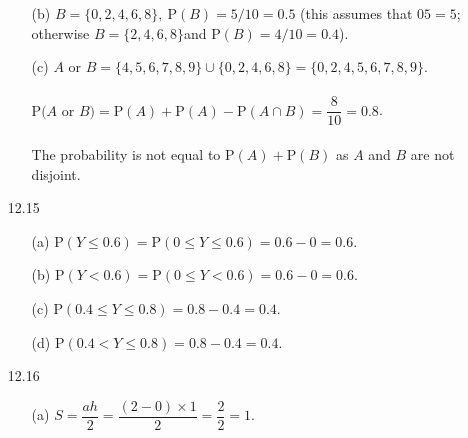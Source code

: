 \documentclass[11pt, a4paper]{article}
\begin{document}
\begin{itemize}
\begin{itemize}
\item[(b)]
$B = \{0, 2, 4, 6, 8\}, \ \text{P}(B) = 5/10 = 0.5$ (this assumes that $05 = 5$; otherwise $B = \{2, 4, 6, 8\}$and $\text{P}(B) = 4/10 = 0.4$).

\item[]

\item[(c)]
$\text{$A$ or $B$} = \{4, 5, 6, 7, 8, 9\} \cup \{0, 2, 4, 6, 8\} = \{0, 2, 4, 5, 6, 7, 8, 9\}$.\\
\vspace{0.005cm}\\
$\text{P$(A$ or $B)$} = \text{P}(A) + \text{P}(A) - \text{P}(A \cap B) = \dfrac{8}{10} = 0.8$.\\
\vspace{0.005cm}\\
The probability is not equal to $\text{P}(A) + \text{P}(B)$ as $A$ and $B$ are not disjoint.
\end{itemize}

\newpage

\item[12.15]
\begin{itemize}
\item[(a)]
$\text{P}(Y \leq 0.6) = \text{P}(0 \leq Y \leq 0.6) = 0.6 - 0 = 0.6$.

\item[]

\item[(b)]
$\text{P}(Y < 0.6) = \text{P}(0 \leq Y < 0.6) = 0.6 - 0 = 0.6$.

\item[]

\item[(c)]
$\text{P}(0.4 \leq Y \leq 0.8) = 0.8 - 0.4 = 0.4$.

\item[]

\item[(d)]
$\text{P}(0.4 < Y \leq 0.8) = 0.8 - 0.4 = 0.4$.
\end{itemize}

\item[]
\item[]

\item[12.16]
\begin{itemize}
\item[(a)]
$S = \dfrac{ah}{2} = \dfrac{(2 - 0) \times 1}{2} = \dfrac{2}{2} = 1$.

\item[]


\end{itemize}
\end{itemize}
\end{document}
